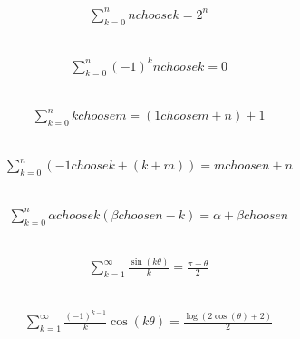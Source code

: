 \documentclass[12pt]{article}
\begin{document}
\subsection{}
\begin{align*}
\sum_{k=0}^{n} n choose k = 2^{n}
\end{align*}
\vspace{1cm}
\subsection{}
\begin{align*}
\sum_{k=0}^{n} \left(-1\right)^{k} n choose k = 0
\end{align*}
\vspace{1cm}
\subsection{}
\begin{align*}
\sum_{k=0}^{n} k choose m = \left(1 choose m + n\right) + 1
\end{align*}
\vspace{1cm}
\subsection{}
\begin{align*}
\sum_{k=0}^{n} \left(- 1 choose k + \left(k + m\right)\right) = m choose n + n
\end{align*}
\vspace{1cm}
\subsection{}
\begin{align*}
\sum_{k=0}^{n} \alpha choose k \left(\beta choose n - k\right) = \alpha + \beta choose n
\end{align*}
\vspace{1cm}
\subsection{}
\begin{align*}
\sum_{k=1}^{\infty} \frac{\sin{\left(k \theta \right)}}{k} = \frac{\pi - \theta}{2}
\end{align*}
\vspace{1cm}
\subsection{}
\begin{align*}
\sum_{k=1}^{\infty} \frac{\left(-1\right)^{k - 1}}{k} \cos{\left(k \theta \right)} = \frac{\log{\left(2 \cos{\left(\theta \right)} + 2 \right)}}{2}
\end{align*}
\vspace{1cm}
\end{document}
